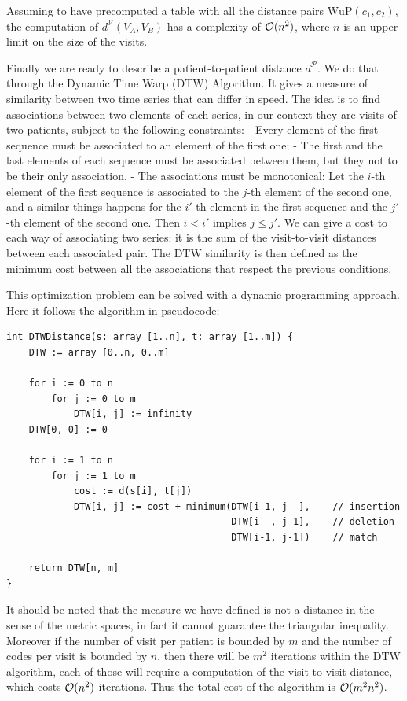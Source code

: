 \documentclass[]{marticle}
\newcommand{\patients}{\mathcal{P}}
\newcommand{\visits}{\mathcal{V}}
\begin{document}
Assuming to have precomputed a table with all the distance pairs $\text{WuP}(c_1, c_2)$, the computation
of $d^\visits (V_A, V_B)$ has a complexity of $\mathcal{O}(n^2)$, where $n$ is an upper limit on the
size of the visits.

Finally we are ready to describe a patient-to-patient distance $d^\patients$. We do that through
the Dynamic Time Warp (DTW) Algorithm. It gives a measure of similarity between two time series that can
differ in speed. The idea is to find associations between two elements of each series, in our
context they are visits of two patients, subject to the following constraints:
- Every element of the first sequence must be associated to an element of the first one;
- The first and the last elements of each sequence must be associated between them, but they not to
  be their only association.
- The associations must be monotonical: Let the $i$-th element of the first sequence is associated
  to the $j$-th element of the second one, and a similar things happens for the $i'$-th element in
  the first sequence and the $j'$-th element of the second one. Then $i<i'$ implies $j\leq j'$.
We can give a cost to each way of associating two series: it is the sum of the visit-to-visit
distances between each associated pair. The DTW similarity is then defined as the minimum cost
between all the associations that respect the previous conditions.

This optimization problem can be solved with a dynamic programming approach. Here it follows the
algorithm in pseudocode:
\begin{verbatim}
int DTWDistance(s: array [1..n], t: array [1..m]) {
    DTW := array [0..n, 0..m]
    
    for i := 0 to n
        for j := 0 to m
            DTW[i, j] := infinity
    DTW[0, 0] := 0
    
    for i := 1 to n
        for j := 1 to m
            cost := d(s[i], t[j])
            DTW[i, j] := cost + minimum(DTW[i-1, j  ],    // insertion
                                        DTW[i  , j-1],    // deletion
                                        DTW[i-1, j-1])    // match
    
    return DTW[n, m]
}
\end{verbatim}

It should be noted that the measure we have defined is not a distance in the sense of the metric
spaces, in fact it cannot guarantee the triangular inequality. Moreover if the number of visit per
patient is bounded by $m$ and the number of codes per visit is bounded by $n$, then there will be
$m^2$ iterations within the DTW algorithm, each of those will require a computation of the
visit-to-visit distance, which costs $\mathcal{O}(n^2)$ iterations. Thus the total cost of the
algorithm is $\mathcal{O}(m^2n^2)$.
\end{document}
